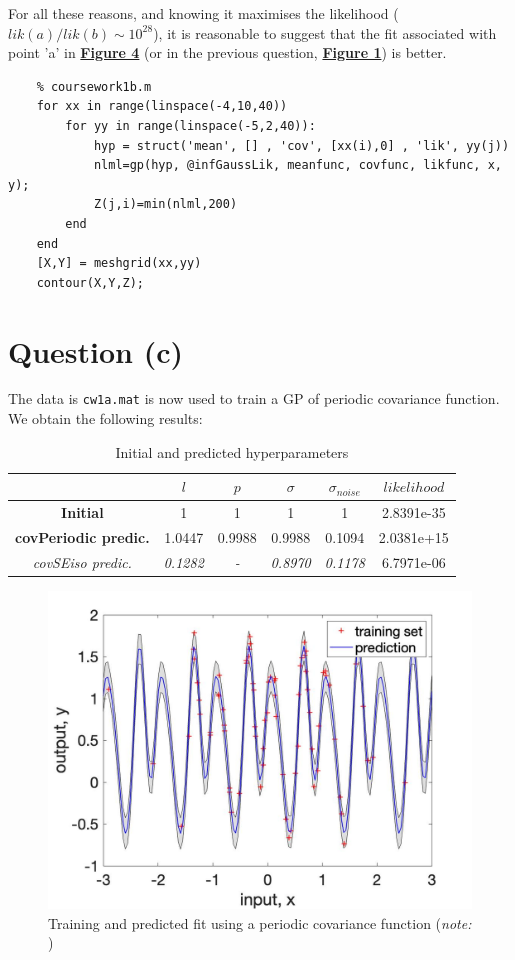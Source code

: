 \documentclass[a4paper,11pt]{article}
\begin{document}
For all these reasons, and knowing it maximises the likelihood ($lik(a)/lik(b) \sim 10^{28}$), it is reasonable to suggest that the fit associated with point 'a' in \hyperref[fig:4]{\textbf{Figure 4}} (or in the previous question, \hyperref[fig:1]{\textbf{Figure 1}}) is better.
\begin{lstlisting}
	% coursework1b.m
	for xx in range(linspace(-4,10,40))
		for yy in range(linspace(-5,2,40)):
			hyp = struct('mean', [] , 'cov', [xx(i),0] , 'lik', yy(j))
			nlml=gp(hyp, @infGaussLik, meanfunc, covfunc, likfunc, x, y);
			Z(j,i)=min(nlml,200)
		end
	end
	[X,Y] = meshgrid(xx,yy)
	contour(X,Y,Z);
\end{lstlisting}
\section*{Question (c)}
The data is \texttt{cw1a.mat} is now used to train a GP of periodic covariance function. We obtain the following results:
	\begin{table}[H]
	\centering
	\begin{tabular}{| c  | c | c | c | c | c |}
		\hline
		& \textbf{$l$} & $p$ &$\sigma$ &  \textbf{$\sigma_{noise}$} & $likelihood$  \\
		\hline \hline
		\textbf{Initial} & 1 & 1 & 1 & 1 &  2.8391e-35 \\
		\hline
		\textbf{covPeriodic predic.} & 1.0447 & 0.9988 & 0.9988 & 0.1094 &  2.0381e+15\\
		\hline \hline
		\textit{covSEiso predic.} &\textit{0.1282} & \textit{-}  & \textit{0.8970} & \textit{0.1178} & 6.7971e-06\\
		\hline
	\end{tabular}
	\caption{Initial and predicted hyperparameters}
\end{table}
\begin{figure}[h]
	\centering
	\includegraphics[width=.6\linewidth]{figures/c1.jpg}
	\caption{Training and predicted fit using a periodic covariance function (\textit{note: })}
\end{figure}
\end{document}
